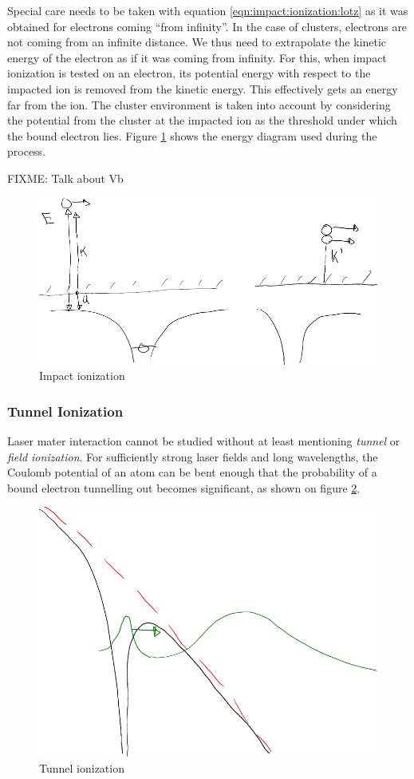 Special care needs to be taken with equation \eqref{eqn:impact:ionization:lotz}
as it was obtained for electrons coming ``from infinity''. In the case of
clusters, electrons are not coming from an infinite distance. We thus need to
extrapolate the kinetic energy of the electron as if it was coming from
infinity. For this, when impact ionization is tested on an electron, its
potential energy with respect to the impacted ion is removed from the kinetic
energy. This effectively gets an energy far from the ion. The cluster
environment is taken into account by considering the potential from the cluster
at the impacted ion as the threshold under which the bound electron lies.
Figure \ref{fig:ionization:impact} shows the energy diagram used during the
process.

FIXME: Talk about Vb

\begin{figure}
 \centering
 \includegraphics[width=0.76\columnwidth]{figures/mockups/ionization_impact}
 \caption{Impact ionization}
 \label{fig:ionization:impact}
\end{figure}


\subsubsection{Tunnel Ionization}
Laser mater interaction cannot be studied without at least mentioning
\textit{tunnel} or \textit{field ionization}. For sufficiently strong laser
fields and long wavelengths, the Coulomb potential of an atom can be bent enough
that the probability of a bound electron tunnelling out becomes significant, as
shown on figure \ref{fig:ionization:tunnel}.

\begin{figure}
 \centering
 \includegraphics[width=0.76\columnwidth]{figures/mockups/ionization_tunnel}
 \caption{Tunnel ionization}
 \label{fig:ionization:tunnel}
\end{figure}

